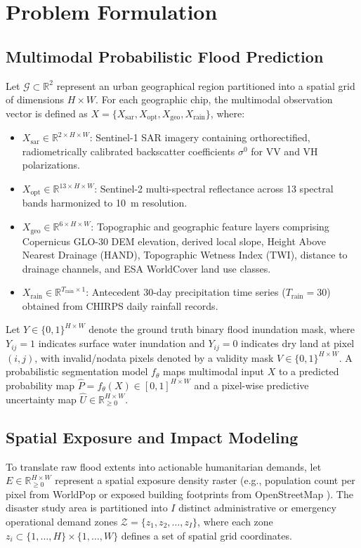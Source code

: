 \documentclass[journal]{IEEEtran}
\begin{document}
\section{Problem Formulation}
\label{sec:formulation}

\subsection{Multimodal Probabilistic Flood Prediction}
Let $\mathcal{G} \subset \mathbb{R}^2$ represent an urban geographical region partitioned into a spatial grid of dimensions $H \times W$. For each geographic chip, the multimodal observation vector is defined as $X = \{X_{\text{sar}}, X_{\text{opt}}, X_{\text{geo}}, X_{\text{rain}}\}$, where:
\begin{itemize}
    \item $X_{\text{sar}} \in \mathbb{R}^{2 \times H \times W}$: Sentinel-1 SAR imagery containing orthorectified, radiometrically calibrated backscatter coefficients $\sigma^0$ for VV and VH polarizations.
    \item $X_{\text{opt}} \in \mathbb{R}^{13 \times H \times W}$: Sentinel-2 multi-spectral reflectance across 13 spectral bands harmonized to 10~m resolution.
    \item $X_{\text{geo}} \in \mathbb{R}^{6 \times H \times W}$: Topographic and geographic feature layers comprising Copernicus GLO-30 DEM elevation, derived local slope, Height Above Nearest Drainage (HAND), Topographic Wetness Index (TWI), distance to drainage channels, and ESA WorldCover land use classes.
    \item $X_{\text{rain}} \in \mathbb{R}^{T_{\text{rain}} \times 1}$: Antecedent 30-day precipitation time series ($T_{\text{rain}} = 30$) obtained from CHIRPS daily rainfall records.
\end{itemize}

Let $Y \in \{0, 1\}^{H \times W}$ denote the ground truth binary flood inundation mask, where $Y_{ij} = 1$ indicates surface water inundation and $Y_{ij} = 0$ indicates dry land at pixel $(i,j)$, with invalid/nodata pixels denoted by a validity mask $V \in \{0, 1\}^{H \times W}$. A probabilistic segmentation model $f_\theta$ maps multimodal input $X$ to a predicted probability map $\hat{P} = f_\theta(X) \in [0, 1]^{H \times W}$ and a pixel-wise predictive uncertainty map $\hat{U} \in \mathbb{R}_{\ge 0}^{H \times W}$.

\subsection{Spatial Exposure and Impact Modeling}
To translate raw flood extents into actionable humanitarian demands, let $E \in \mathbb{R}_{\ge 0}^{H \times W}$ represent a spatial exposure density raster (e.g., population count per pixel from WorldPop \cite{lloyd2019} or exposed building footprints from OpenStreetMap \cite{haklay2008}). The disaster study area is partitioned into $I$ distinct administrative or emergency operational demand zones $\mathcal{Z} = \{z_1, z_2, \dots, z_I\}$, where each zone $z_i \subset \{1, \dots, H\} \times \{1, \dots, W\}$ defines a set of spatial grid coordinates.
\end{document}
